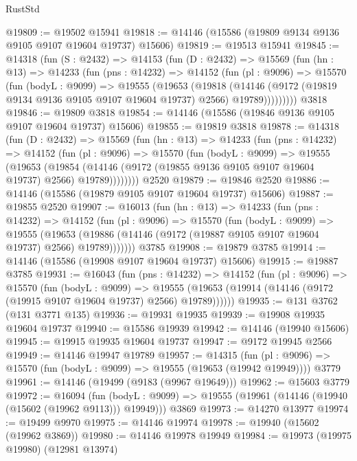 \begin{lexlean}{RustStd}
\begin{coremodule}
@19809 := @19502 @15941
@19818 := @14146 (@15586 (@19809 @9134 @9136 @9105 @9107 @19604 @19737) @15606)
@19819 := @19513 @15941
@19845 := @14318
    (fun (S : @2432) =>
    @14153
      (fun (D : @2432) =>
      @15569
        (fun (hn : @13) =>
        @14233
          (fun (pns : @14232) =>
          @14152
            (fun (pl : @9096) =>
            @15570
              (fun (bodyL : @9099) =>
              @19555
                (@19653
                  (@19818
                    (@14146
                      (@9172 (@19819 @9134 @9136 @9105 @9107 @19604 @19737) @2566)
                      @19789)))))))))
    @3818
@19846 := @19809 @3818
@19854 := @14146 (@15586 (@19846 @9136 @9105 @9107 @19604 @19737) @15606)
@19855 := @19819 @3818
@19878 := @14318
    (fun (D : @2432) =>
    @15569
      (fun (hn : @13) =>
      @14233
        (fun (pns : @14232) =>
        @14152
          (fun (pl : @9096) =>
          @15570
            (fun (bodyL : @9099) =>
            @19555
              (@19653
                (@19854
                  (@14146 (@9172 (@19855 @9136 @9105 @9107 @19604 @19737) @2566) @19789))))))))
    @2520
@19879 := @19846 @2520
@19886 := @14146 (@15586 (@19879 @9105 @9107 @19604 @19737) @15606)
@19887 := @19855 @2520
@19907 := @16013
    (fun (hn : @13) =>
    @14233
      (fun (pns : @14232) =>
      @14152
        (fun (pl : @9096) =>
        @15570
          (fun (bodyL : @9099) =>
          @19555
            (@19653 (@19886 (@14146 (@9172 (@19887 @9105 @9107 @19604 @19737) @2566) @19789)))))))
    @3785
@19908 := @19879 @3785
@19914 := @14146 (@15586 (@19908 @9107 @19604 @19737) @15606)
@19915 := @19887 @3785
@19931 := @16043
    (fun (pns : @14232) =>
    @14152
      (fun (pl : @9096) =>
      @15570
        (fun (bodyL : @9099) =>
        @19555 (@19653 (@19914 (@14146 (@9172 (@19915 @9107 @19604 @19737) @2566) @19789))))))
@19935 := @131 @3762 (@131 @3771 @135)
@19936 := @19931 @19935
@19939 := @19908 @19935 @19604 @19737
@19940 := @15586 @19939
@19942 := @14146 (@19940 @15606)
@19945 := @19915 @19935 @19604 @19737
@19947 := @9172 @19945 @2566
@19949 := @14146 @19947 @19789
@19957 := @14315
    (fun (pl : @9096) => @15570 (fun (bodyL : @9099) => @19555 (@19653 (@19942 @19949))))
    @3779
@19961 := @14146 (@19499 (@9183 (@9967 @19649)))
@19962 := @15603 @3779
@19972 := @16094
    (fun (bodyL : @9099) => @19555 (@19961 (@14146 (@19940 (@15602 (@19962 @9113))) @19949)))
    @3869
@19973 := @14270 @13977
@19974 := @19499 @9970
@19975 := @14146 @19974
@19978 := @19940 (@15602 (@19962 @3869))
@19980 := @14146 @19978 @19949
@19984 := @19973 (@19975 @19980) (@12981 @13974)

\end{coremodule}
\end{lexlean}
